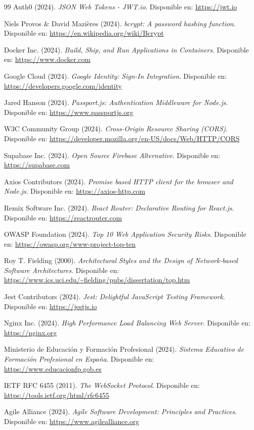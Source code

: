 \documentclass[a4paper]{report}
\begin{document}
\begin{thebibliography}{99}
Auth0 (2024). \textit{JSON Web Tokens - JWT.io}. 
Disponible en: \url{https://jwt.io}

Niels Provos \& David Mazières (2024). \textit{bcrypt: A password hashing function}. 
Disponible en: \url{https://en.wikipedia.org/wiki/Bcrypt}

Docker Inc. (2024). \textit{Build, Ship, and Run Applications in Containers}. 
Disponible en: \url{https://www.docker.com}

Google Cloud (2024). \textit{Google Identity: Sign-In Integration}. 
Disponible en: \url{https://developers.google.com/identity}

Jared Hanson (2024). \textit{Passport.js: Authentication Middleware for Node.js}. 
Disponible en: \url{https://www.passportjs.org}

W3C Community Group (2024). \textit{Cross-Origin Resource Sharing (CORS)}. 
Disponible en: \url{https://developer.mozilla.org/en-US/docs/Web/HTTP/CORS}

Supabase Inc. (2024). \textit{Open Source Firebase Alternative}. 
Disponible en: \url{https://supabase.com}

Axios Contributors (2024). \textit{Promise based HTTP client for the browser and Node.js}. 
Disponible en: \url{https://axios-http.com}

Remix Software Inc. (2024). \textit{React Router: Declarative Routing for React.js}. 
Disponible en: \url{https://reactrouter.com}

OWASP Foundation (2024). \textit{Top 10 Web Application Security Risks}. 
Disponible en: \url{https://owasp.org/www-project-top-ten}

Roy T. Fielding (2000). \textit{Architectural Styles and the Design of Network-based Software Architectures}. 
Disponible en: \url{https://www.ics.uci.edu/~fielding/pubs/dissertation/top.htm}

Jest Contributors (2024). \textit{Jest: Delightful JavaScript Testing Framework}. 
Disponible en: \url{https://jestjs.io}

Nginx Inc. (2024). \textit{High Performance Load Balancing Web Server}. 
Disponible en: \url{https://nginx.org}

Ministerio de Educación y Formación Profesional (2024). \textit{Sistema Educativo de Formación Profesional en España}. 
Disponible en: \url{https://www.educacionfp.gob.es}

IETF RFC 6455 (2011). \textit{The WebSocket Protocol}. 
Disponible en: \url{https://tools.ietf.org/html/rfc6455}

Agile Alliance (2024). \textit{Agile Software Development: Principles and Practices}. 
Disponible en: \url{https://www.agilealliance.org}

\end{thebibliography}
\end{document}
